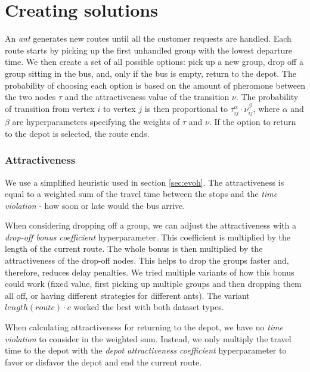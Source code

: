 \section{Creating solutions}

An \textit{ant} generates new routes until all the customer requests are handled. Each route starts by picking up the first unhandled group with the lowest departure time. We then create a set of all possible options: pick up a new group, drop off a group sitting in the bus, and, only if the bus is empty, return to the depot. The probability of choosing each option is based on the amount of pheromone between the two nodes $\tau$ and the attractiveness value of the transition $\nu$. The probability of transition from vertex $i$ to vertex $j$ is then proportional to $\tau_{ij}^\alpha \cdot \nu_{ij}^\beta$, where $\alpha$ and $\beta$ are hyperparameters specifying the weights of $\tau$ and $\nu$. If the option to return to the depot is selected, the route ends.

\subsubsection{Attractiveness}\label{sec:attractiveness}

We use a simplified heuristic used in section \ref{sec:evoh}. The attractiveness is equal to a weighted sum of the travel time between the stops and the \textit{time violation} - how soon or late would the bus arrive.

When considering dropping off a group, we can adjust the attractiveness with a \textit{drop-off bonus coefficient} hyperparameter. This coefficient is multiplied by the length of the current route. The whole bonus is then multiplied by the attractiveness of the drop-off nodes. This helps to drop the groups faster and, therefore, reduces delay penalties. We tried multiple variants of how this bonus could work (fixed value, first picking up multiple groups and then dropping them all off, or having different strategies for different ants). The variant $length(route) \cdot c$ worked the best with both dataset types.

When calculating attractiveness for returning to the depot, we have no \textit{time violation} to consider in the weighted sum. Instead, we only multiply the travel time to the depot with the \textit{depot attractiveness coefficient} hyperparameter to favor or disfavor the depot and end the current route.

